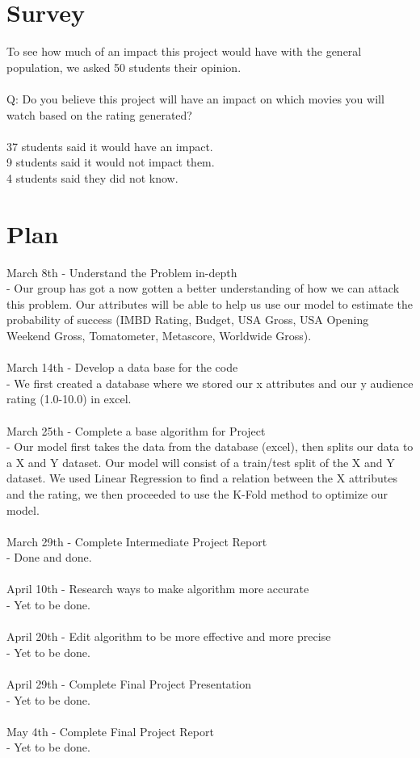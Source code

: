 \documentclass[10pt,twocolumn,letterpaper]{article}
\begin{document}
\section{Survey}
	To see how much of an impact this project would have with the general population, we asked 50 students their opinion.\\\\
	Q: Do you believe this project will have an impact on which movies you will watch based on the rating generated?\\\\
	37 students said it would have an impact.\\
	9 students said it would not impact them.\\
	4 students said they did not know.

\section{Plan}
	March 8th - Understand the Problem in-depth\\
	- Our group has got a now gotten a better understanding of how we can attack this problem. Our attributes will be able to help us use our model to estimate the probability of success (IMBD Rating, Budget, USA Gross, USA Opening Weekend Gross, Tomatometer, Metascore, Worldwide Gross).\\\\
	March 14th - Develop a data base for the code\\
	- We first created a database where we stored our x attributes and our y audience rating (1.0-10.0) in excel.\\\\
	March 25th - Complete a base algorithm for Project\\
	- Our model first takes the data from the database (excel), then splits our data to a X and Y dataset. Our model will consist of a train/test split of the X and Y dataset. We used Linear Regression to find a relation between the X attributes and the rating, we then proceeded to use the K-Fold method to optimize our model.\\\\
	March 29th - Complete Intermediate Project Report\\
	- Done and done.\\\\
	April 10th - Research ways to make algorithm more accurate\\
	- Yet to be done.\\\\
	April 20th - Edit algorithm to be more effective and more precise\\
	- Yet to be done.\\\\
	April 29th - Complete Final Project Presentation\\
	- Yet to be done.\\\\
	May 4th - Complete Final Project Report\\
	- Yet to be done.
\end{document}
